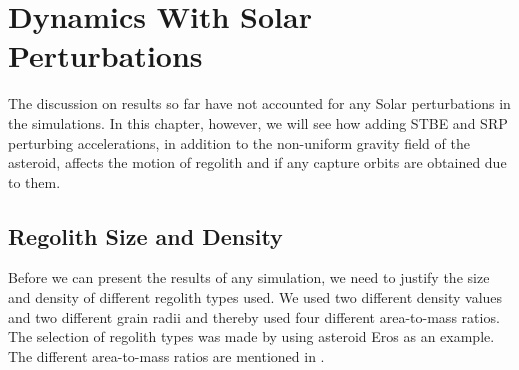 \chapter{Dynamics With Solar Perturbations}
\label{chap:dynamics_with_solar_perturbations}
\graphicspath{{Results/Images/}}

The discussion on results so far have not accounted for any Solar perturbations in the simulations. In this chapter, however, we will see how adding \gls{STBE} and \gls{SRP} perturbing accelerations, in addition to the non-uniform gravity field of the asteroid, affects the motion of regolith and if any capture orbits are obtained due to them.

\section{Regolith Size and Density}
\label{sec:regolith_size_density}
Before we can present the results of any simulation, we need to justify the size and density of different regolith types used. We used two different density values and two different grain radii and thereby used four different area-to-mass ratios. The selection of regolith types was made by using asteroid Eros as an example. The different area-to-mass ratios are mentioned in .

